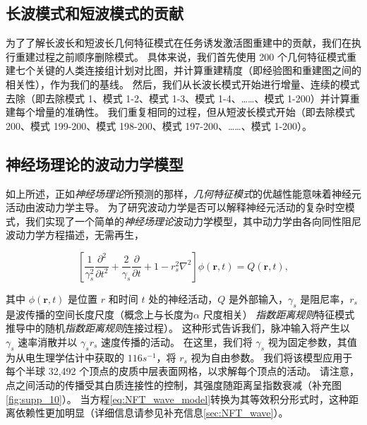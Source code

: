 \documentclass[lang=cn,a4paper,newtx,citestyle=gb7714-2015, bibstyle=gb7714-2015]{elegantpaper}
\begin{document}
\subsection{长波模式和短波模式的贡献} \label{sec:wavelength_contributions}

为了了解长波长和短波长几何特征模式在任务诱发激活图重建中的贡献，我们在执行重建过程之前顺序删除模式。
具体来说，我们首先使用 200 个几何特征模式重建七个关键的人类连接组计划对比图，并计算重建精度（即经验图和重建图之间的相关性），作为我们的基线。
然后，我们从长波长模式开始进行增量、连续的模式去除（即去除模式 1、模式 1-2、模式 1-3、模式 1-4、……、模式 1-200）并计算重建每个增量的准确性。
我们重复相同的过程，但从短波长模式开始（即去除模式 200、模式 199-200、模式 198-200、模式 197-200、……、模式 1-200）。


\subsection{神经场理论的波动力学模型} \label{sec:NFT_model}

如上所述，正如\textit{神经场理论}所预测的那样，\textit{几何特征模式}的优越性能意味着神经元活动由波动力学主导。
为了研究波动力学是否可以解释神经元活动的复杂时空模式，我们实现了一个简单的\textit{神经场理论}波动力学模型，其中动力学由各向同性阻尼波动力学方程描述，无需再生\cite{jirsa1996field,robinson1997propagation}，

\begin{equation}\label{eq:NFT_wave_model}
	[\frac{1}{\gamma_s^2} \frac{\partial ^2}{\partial t^2} + 
	\frac{2}{\gamma_s} \frac{\partial}{\partial t} + 1 - r_s^2 \nabla^2] \phi(\boldsymbol{r}, t) = Q(\boldsymbol{r}, t),
\end{equation}

其中 $ \phi(\boldsymbol{r}, t) $ 是位置 $ r $ 和时间 $ t $ 处的神经活动，$ Q $ 是外部输入，$ \gamma_s $ 是阻尼率，$ r_s $ 是波传播的空间长度尺度（概念上与长度为$ \alpha $ 尺度相关） \textit{指数距离规则}特征模式推导中的随机\textit{指数距离规则}连接过程）。
这种形式告诉我们，脉冲输入将产生以 $ \gamma_s $ 速率消散并以 $ \gamma_s r_s $ 速度传播的活动。
在这里，我们将 $ \gamma_s $ 视为固定参数，其值为从电生理学估计中获取的 $ 116 s^{-1} $\cite{robinson2005multiscale}，将 $ r_s $ 视为自由参数。
我们将该模型应用于每个半球 32,492 个顶点的皮质中层表面网格，以求解每个顶点的活动。
请注意，点之间活动的传播受其白质连接性的控制，其强度随距离呈指数衰减（补充图\ref{fig:supp_10}）。
当方程\ref{eq:NFT_wave_model}转换为其等效积分形式时，这种距离依赖性更加明显（详细信息请参见补充信息\ref{sec:NFT_wave}）。
\end{document}
